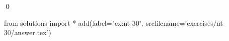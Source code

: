 
\begin{ex} 
  \label{ex:nt-30}
  
  \qed
\end{ex} 
\begin{python0}
from solutions import *
add(label="ex:nt-30",
    srcfilename='exercises/nt-30/answer.tex') 
\end{python0}
